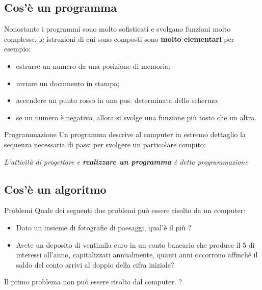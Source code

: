 \subsection{Cos'è un programma}
\begin{frame}
\begin{block}{}
Nonostante i programmi sono molto sofisticati e svolgano funzioni molto complesse, le 
istruzioni di cui sono composti sono \textbf{molto elementari} per esempio:
\begin{itemize}
\item estrarre un numero da una posizione di memoria;
\item inviare un documento in stampa;
\item accendere un punto rosso in una pos. determinata dello schermo;
\item se un numero è negativo, allora si svolge una funzione più tosto che un altra.
\end{itemize}
\end{block}
\begin{block}{Programmazione}
Un programma descrive al computer in estremo dettaglio la sequenza necessaria di 
passi per svolgere un particolare compito:
\begin{center}
\itshape{L'attività di progettare e \textbf{realizzare un programma} è detta \alert{programmazione}}
\end{center}
\end{block}
\end{frame}

\subsection{Cos'è un algoritmo}
\begin{frame}
\begin{block}{Problemi}
Quale dei seguenti due problemi può essere risolto da un computer:
\begin{itemize}
\item Dato un insieme di fotografie di paesaggi, qual'è il più ?
\item Avete un deposito di ventimila euro in un conto bancario che produce il 5%
di interessi all'anno, capitalizzati annualmente, quanti anni occorrono affinché 
il saldo del conto arrivi al doppio della cifra iniziale?
\end{itemize}
\end{block}
\pause
\begin{block}{}
Il primo problema non può essere risolto dal computer. \textbf{}?
\end{block}
\end{frame}

